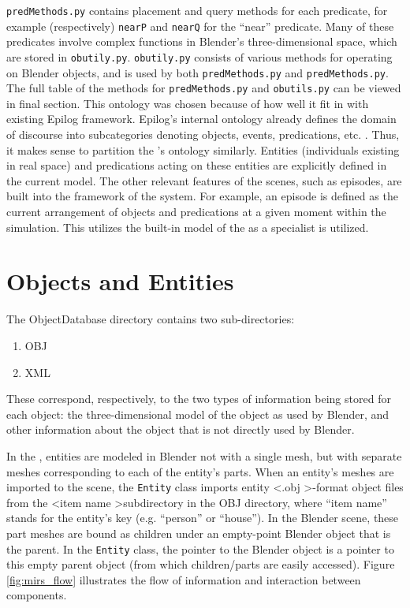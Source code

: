\texttt{predMethods.py} contains placement and query methods for each predicate, for example (respectively) \texttt{nearP} and \texttt{nearQ} for the ``near'' predicate. 
Many of these predicates involve complex functions in Blender's three-dimensional space, which are stored in \texttt{obutily.py}.
\texttt{obutily.py} consists of various methods for operating on Blender objects, and is used by both \texttt{predMethods.py} and \texttt{predMethods.py}.
The full table of the methods for \texttt{predMethods.py} and \texttt{obutils.py} can be viewed in final section.
This ontology was chosen because of how well it fit in with existing Epilog framework. Epilog's internal ontology already defines the domain of discourse into subcategories denoting objects, events, predications, etc. \cite{schubert2000episodic}. Thus, it makes sense to partition the \TDS's ontology similarly. Entities (individuals existing in real space) and predications acting on these entities are explicitly defined in the current model. The other relevant features of the scenes, such as episodes, are built into the framework of the system. For example, an episode is defined as the current arrangement of objects and predications at a given moment within the simulation. This utilizes the built-in model of the \TDS as a specialist is utilized.

\section{Objects and Entities}

The ObjectDatabase directory contains two sub-directories: 

\begin{enumerate}
	\item OBJ 
	\item XML
\end{enumerate}
 
These correspond, respectively, to the two types of information being stored for each object: the three-dimensional model of the object as used by Blender, and other information about the object that is not directly used by Blender. 

In the \TDS, entities are modeled in Blender not with a single mesh, but with separate meshes corresponding to each of the entity's parts. 
When an entity's meshes are imported to the scene, the \texttt{Entity} class imports entity \textless .obj \textgreater-format object files from the \textless item name \textgreater subdirectory in the OBJ directory, where ``item name'' stands for the entity's key (e.g. ``person'' or ``house''). In the Blender scene, these part meshes are bound as children under an empty-point Blender object that is the parent. In the \texttt{Entity} class, the pointer to the Blender object is a pointer to this empty parent object (from which children/parts are easily accessed). Figure \ref{fig:mirs_flow} illustrates the flow of information and interaction between components.

